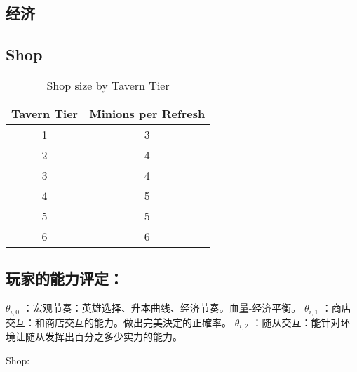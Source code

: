 \documentclass[UTF8]{ctexart}
\begin{document}
\subsection{经济}

\subsection{Shop}

\begin{table}[ht]
  \centering
  \caption{Shop size by Tavern Tier}
  \label{tab:tier_shop_size}
  \begin{tabular}{cc}
    \toprule
    Tavern Tier & Minions per Refresh \\
    \midrule
     1 & 3 \\
     2 & 4 \\
     3 & 4 \\
     4 & 5 \\
     5 & 5 \\
     6 & 6 \\
    \bottomrule
  \end{tabular}
\end{table}


\subsection{玩家的能力评定：}
$\theta_{i,0}$ ：宏观节奏：英雄选择、升本曲线、经济节奏。血量-经济平衡。
$\theta_{i,1}$ ：商店交互：和商店交互的能力。做出完美決定的正確率。
$\theta_{i,2}$ ：随从交互：能针对环境让随从发挥出百分之多少实力的能力。

Shop:
\end{document}
